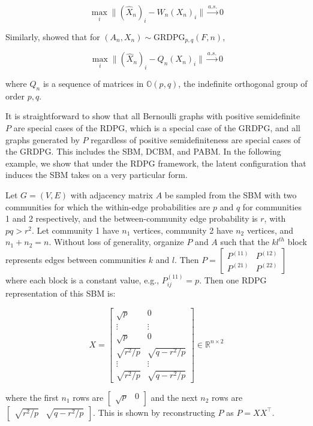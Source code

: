 \documentclass[
  11pt,
]{article}
\begin{document}
\begin{equation}
\max_i \|(\hat{X}_n)_i - W_n (X_n)_i \| \stackrel{a.s.}{\to} 0
\end{equation}

Similarly, \citet{rubindelanchy2017statistical} showed that for
\((A_n, X_n) \sim \text{GRDPG}_{p, q}(F, n)\),

\begin{equation}
\max_i \|(\hat{X}_n)_i - Q_n (X_n)_i \| \stackrel{a.s.}{\to} 0
\end{equation}

where \(Q_n\) is a sequence of matrices in \(\mathbb{O}(p, q)\), the
indefinite orthogonal group of order \(p, q\).

It is straightforward to show that all Bernoulli graphs with positive
semidefinite \(P\) are special cases of the RDPG, which is a special
case of the GRDPG, and all graphs generated by \(P\) regardless of
positive semidefiniteness are special cases of the GRDPG. This includes
the SBM, DCBM, and PABM. In the following example, we show that under
the RDPG framework, the latent configuration that induces the SBM takes
on a very particular form.

\begin{example}
Let $G = (V, E)$ with adjacency matrix $A$ be sampled from the SBM with two communities for which the within-edge probabilities are $p$ and $q$ for communities 1 and 2 respectively, and the between-community edge probability is $r$, with $p q > r^2$. Let community 1 have $n_1$ vertices, community 2 have $n_2$ vertices, and $n_1 + n_2 = n$. Without loss of generality, organize $P$ and $A$ such that the $kl^{th}$ block represents edges between communities $k$ and $l$. Then $P = \begin{bmatrix} P^{(11)} & P^{(12)} \\ P^{(21)} & P^{(22)} \end{bmatrix}$ where each block is a constant value, e.g., $P^{(11)}_{ij} = p$. Then one RDPG representation of this SBM is:

$$X = \begin{bmatrix} 
\sqrt{p} & 0 \\
\vdots & \vdots \\
\sqrt{p} & 0 \\
\sqrt{r^2 / p} & \sqrt{q - r^2 / p} \\ 
\vdots & \vdots \\
\sqrt{r^2 / p} & \sqrt{q - r^2 / p}
\end{bmatrix}
\in \mathbb{R}^{n \times 2}$$

where the first $n_1$ rows are $\begin{bmatrix} \sqrt{p} & 0 \end{bmatrix}$ and the next $n_2$ rows are $\begin{bmatrix} \sqrt{r^2 / p} & \sqrt{q - r^2 / p} \end{bmatrix}$. This is shown by reconstructing $P$ as $P = X X^\top$.
\end{example}
\end{document}
